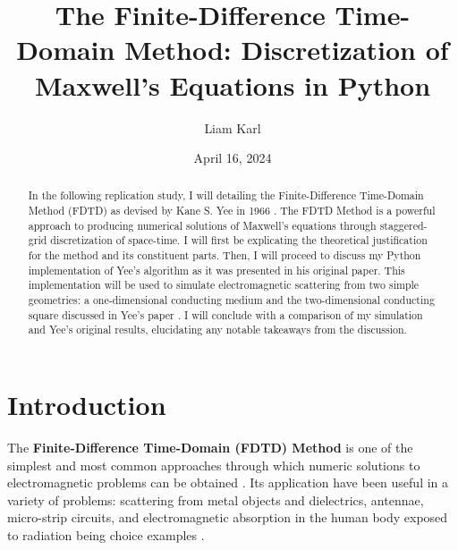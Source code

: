 \documentclass[reprint,preprintnumbers,amsmath,amssymb,aps,nofootinbib,showkeys]{revtex4-2}
\begin{document}

\title{The Finite-Difference Time-Domain Method: Discretization of Maxwell's Equations in Python}
\author{Liam Karl}
\date{April 16, 2024}

\begin{abstract}
    In the following replication study, I will detailing the Finite-Difference Time-Domain Method (FDTD) as devised by Kane S. Yee in 1966 \cite{Yee}. The FDTD Method is a powerful  approach to producing numerical solutions of  Maxwell's equations through staggered-grid discretization of space-time. I will first be explicating the theoretical justification for the method and its constituent parts. Then, I will proceed to discuss my Python implementation of Yee's algorithm as it was presented in his original paper. This implementation will be used to simulate electromagnetic scattering from two simple geometries: a one-dimensional conducting medium and the two-dimensional conducting square discussed in Yee's paper \cite{Yee}. I will conclude with a comparison of my simulation and Yee's original results, elucidating any notable takeaways from the discussion.
\end{abstract}


\maketitle


\section{Introduction}

    The \textbf{Finite-Difference Time-Domain (FDTD) Method} is one of the simplest and most common approaches through which numeric solutions to electromagnetic problems can be obtained \cite{Schneider}. Its application have been useful in a variety of problems: scattering from metal objects and dielectrics, antennae, micro-strip circuits, and electromagnetic absorption in the human body exposed to radiation being choice examples \cite{Utah}.
\end{document}
